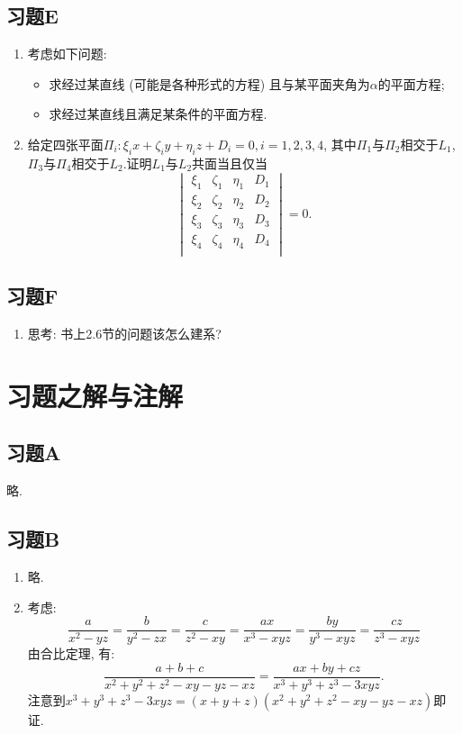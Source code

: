 \documentclass[./main.tex]{subfiles}
\begin{document}
\subsection*{习题E}
\begin{enumerate}
    \item 考虑如下问题: 
    \begin{itemize}
        \item 求经过某直线 (可能是各种形式的方程) 且与某平面夹角为$\alpha$的平面方程; 
        \item 求经过某直线且满足某条件的平面方程.
    \end{itemize}
\item 给定四张平面$\Pi_i:\xi_i x+\zeta_i y+\eta_i z +D_i=0,i=1,2,3,4$, 其中$\Pi_1$与$\Pi_2$相交于$L_1$, $\Pi_3$与$\Pi_4$相交于$L_2$.证明$L_1$与$L_2$共面当且仅当$$\begin{vmatrix}
    \xi_1 & \zeta_1 & \eta_1 & D_1\\
    \xi_2 & \zeta_2 & \eta_2 & D_2\\
    \xi_3 & \zeta_3 & \eta_3 & D_3\\
    \xi_4 & \zeta_4 & \eta_4 & D_4\\
    \end{vmatrix}=0.$$
\end{enumerate}

\subsection*{习题F}
\begin{enumerate}
    \item 思考: 书上2.6节的问题该怎么建系? 
\end{enumerate}

\section{习题之解与注解}
\subsection*{习题A}
略.

\subsection*{习题B}
\begin{enumerate}
    \item 略.
    \item 考虑: $$\frac{a}{x^2-yz}=\frac{b}{y^2-zx}=\frac{c}{z^2-xy}=\frac{ax}{x^3-xyz}=\frac{by}{y^3-xyz}=\frac{cz}{z^3-xyz}$$由合比定理, 有: $$\frac{a+b+c}{x^2+y^2+z^2-xy-yz-xz}=\frac{ax+by+cz}{x^3+y^3+z^3-3xyz}.$$注意到$x^3+y^3+z^3-3xyz=(x+y+z)(x^2+y^2+z^2-xy-yz-xz)$即证.
\end{enumerate}
\end{document}
